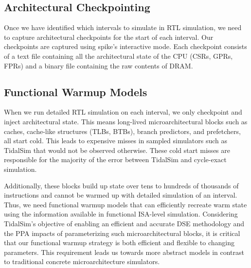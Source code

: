 \documentclass[sigplan,nonacm,10pt]{acmart}
\begin{document}
\subsection{Architectural Checkpointing}

Once we have identified which intervals to simulate in RTL simulation, we need to capture architectural checkpoints for the start of each interval.
Our checkpoints are captured using spike's interactive mode.
Each checkpoint consists of a text file containing all the architectural state of the CPU (CSRs, GPRs, FPRs) and a binary file containing the raw contents of DRAM.

\subsection{Functional Warmup Models}




When we run detailed RTL simulation on each interval, we only checkpoint and inject architectural state. This means long-lived microarchitectural blocks such as caches, cache-like structures (TLBs, BTBs), branch predictors, and prefetchers, all start cold.
This leads to expensive misses in sampled simulators such as TidalSim that would not be observed otherwise. These cold start misses are responsible for the majority of the error between TidalSim and cycle-exact simulation.

Additionally, these blocks build up state over tens to hundreds of thousands of instructions and cannot be warmed up with detailed simulation of an interval. Thus, we need functional warmup models that can efficiently recreate warm state using the information available in functional ISA-level simulation.
Considering TidalSim's objective of enabling an efficient and accurate DSE methodology and the PPA impacts of parameterizing such microarchitectural blocks, it is critical that our functional warmup strategy is both efficient and flexible to changing parameters. This requirement leads us towards more abstract models in contrast to traditional concrete microarchitecture simulators.
\end{document}
